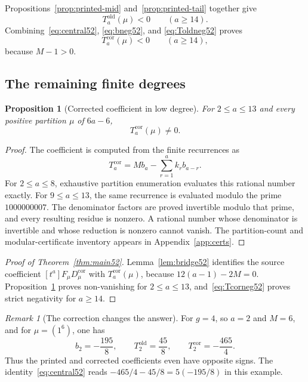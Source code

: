 \documentclass[11pt]{article}
\newtheorem{proposition}[theorem]{Proposition}
\theoremstyle{definition}
\theoremstyle{remark}
\newtheorem{remark}[theorem]{Remark}
\begin{document}
Propositions~\ref{prop:printed-mid} and~\ref{prop:printed-tail} together give
\begin{equation}\label{eq:Toldneg52}
  T_a^{\mathrm{old}}(\mu)<0\qquad(a\ge14).
\end{equation}
Combining~\eqref{eq:central52}, \eqref{eq:bneg52}, and
\eqref{eq:Toldneg52} proves
\begin{equation}\label{eq:Tcorneg52}
  T_a^{\mathrm{cor}}(\mu)<0\qquad(a\ge14),
\end{equation}
because $M-1>0$.

\subsection{The remaining finite degrees}\label{subsec:finite52}

\begin{proposition}[Corrected coefficient in low degree]
\label{prop:corrected-low}
For $2\le a\le13$ and every positive partition $\mu$ of $6a-6$,
\[
  T_a^{\mathrm{cor}}(\mu)\ne0.
\]
\end{proposition}

\begin{proof}
The coefficient is computed from the finite recurrences as
\[
 T_a^{\mathrm{cor}}
   =Mb_a-\sum_{r=1}^{a}k_rb_{a-r}.
\]
For $2\le a\le8$, exhaustive partition enumeration evaluates this rational
number exactly.  For $9\le a\le13$, the same recurrence is evaluated modulo
the prime $1000000007$.  The denominator factors are proved invertible modulo
that prime, and every resulting residue is nonzero.  A rational number whose
denominator is invertible and whose reduction is nonzero cannot vanish.  The
partition-count and modular-certificate inventory appears in
Appendix~\ref{app:certs}.
\end{proof}

\begin{proof}[Proof of Theorem~\ref{thm:main52}]
Lemma~\ref{lem:bridge52} identifies the source coefficient
$[t^a]F_\mu D_\mu^{\mathrm{cor}}$ with $T_a^{\mathrm{cor}}(\mu)$, because
$12(a-1)-2M=0$.  Proposition~\ref{prop:corrected-low} proves non-vanishing for
$2\le a\le13$, and~\eqref{eq:Tcorneg52} proves strict negativity for
$a\ge14$.
\end{proof}

\begin{remark}[The correction changes the answer]
For $g=4$, so $a=2$ and $M=6$, and for $\mu=(1^6)$, one has
\[
 b_2=-\frac{195}{8},\qquad
 T_2^{\mathrm{old}}=\frac{45}{8},\qquad
 T_2^{\mathrm{cor}}=-\frac{465}{4}.
\]
Thus the printed and corrected coefficients even have opposite signs.  The
identity~\eqref{eq:central52} reads
$-465/4-45/8=5(-195/8)$ in this example.
\end{remark}
\end{document}
